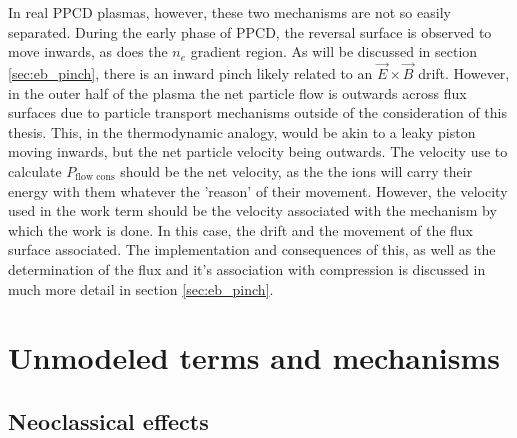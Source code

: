 \begin{refsection}
In real PPCD plasmas, however, these two mechanisms are not so easily separated. During the early phase of PPCD, the reversal surface is observed to move inwards, as does the $n_e$ gradient region. As will be discussed in section \ref{sec:eb_pinch}, there is an inward pinch likely related to an $\vec{E}\times\vec{B}$ drift. However, in the outer half of the plasma the net particle flow is outwards across flux surfaces due to particle transport mechanisms outside of the consideration of this thesis. This, in the thermodynamic analogy, would be akin to a leaky piston moving inwards, but the net particle velocity being outwards. The velocity use to calculate $P_{\text{flow cons}}$ should be the net velocity, as the the ions will carry their energy with them whatever the 'reason' of their movement. However, the velocity used in the work term should be the velocity associated with the mechanism by which the work is done. In this case, the \ecb drift and the movement of the flux surface associated. The implementation and consequences of this, as well as the determination of the \ecb flux and it's association with compression is discussed in much more detail in section \ref{sec:eb_pinch}.

\section{Unmodeled terms and mechanisms}

\subsection{Neoclassical effects}\label{sec:neoclassical_cond}


\end{refsection}
